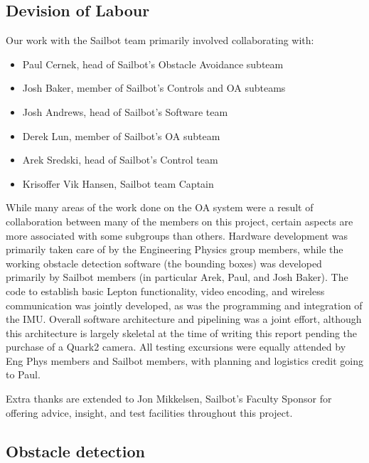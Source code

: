 \appendix
\renewcommand{\thesubsection}{\Alph{subsection}}
\renewcommand{\thesubsubsection}{\thesubsection.\arabic{subsubsection}}
\subsection{\label{app:AppendixA}Devision of Labour}
Our work with the Sailbot team primarily involved collaborating with:

\begin{itemize}
 \item Paul Cernek, head of Sailbot's Obstacle Avoidance subteam
 \item Josh Baker, member of Sailbot's Controls and OA subteams
 \item Josh Andrews, head of Sailbot's Software team
 \item Derek Lun, member of Sailbot's OA subteam
 \item Arek Sredski, head of Sailbot's Control team
 \item Krisoffer Vik Hansen, Sailbot team Captain
\end{itemize}

While many areas of the work done on the OA system were a result of collaboration between many of the members on this project, certain aspects are more associated with some subgroups than others. Hardware development was primarily taken care of by the Engineering Physics group members, while the working obstacle detection software (the bounding boxes) was developed primarily by Sailbot members (in particular Arek, Paul, and Josh Baker). The code to establish basic Lepton functionality, video encoding, and wireless communication was jointly developed, as was the programming and integration of the IMU. Overall software architecture and pipelining was a joint effort, although this architecture is largely skeletal at the time of writing this report pending the purchase of a Quark2 camera. All testing excursions were equally attended by Eng Phys members and Sailbot members, with planning and logistics credit going to Paul.

Extra thanks are extended to Jon Mikkelsen, Sailbot's Faculty Sponsor for offering advice, insight, and test facilities throughout this project.

\clearpage
\newpage
\subsection{\label{app:AppendixB}Obstacle detection} 

